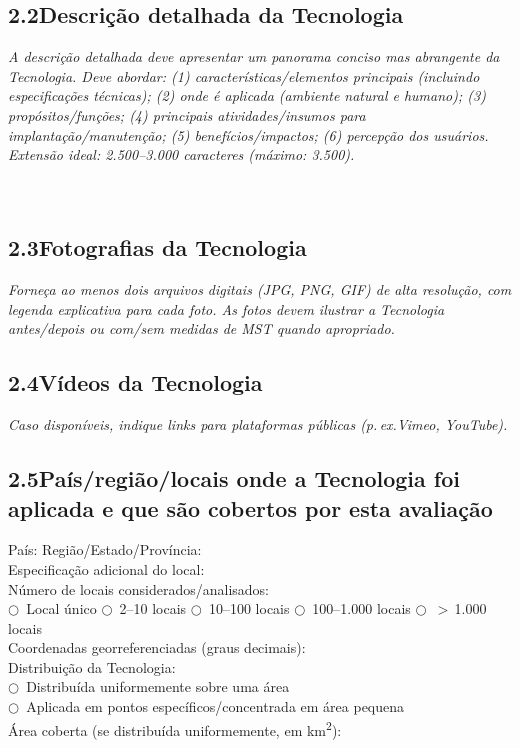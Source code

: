 \subsection{2.2\quad Descrição detalhada da Tecnologia}
\textit{A descrição detalhada deve apresentar um panorama conciso mas abrangente da Tecnologia. Deve abordar: (1) características/elementos principais (incluindo especificações técnicas); (2) onde é aplicada (ambiente natural e humano); (3) propósitos/funções; (4) principais atividades/insumos para implantação/manutenção; (5) benefícios/impactos; (6) percepção dos usuários. Extensão ideal: 2.500--3.000 caracteres (máximo: 3.500).}\\[4pt]
\dotfill\\[2pt]\dotfill\\[2pt]\dotfill

\subsection{2.3\quad Fotografias da Tecnologia}
\textit{Forneça ao menos dois arquivos digitais (JPG, PNG, GIF) de alta resolução, com legenda explicativa para cada foto. As fotos devem ilustrar a Tecnologia antes/depois ou com/sem medidas de MST quando apropriado.}

\subsection{2.4\quad Vídeos da Tecnologia}
\textit{Caso disponíveis, indique links para plataformas públicas (p.\,ex.\@ Vimeo, YouTube).}

\subsection{2.5\quad País/região/locais onde a Tecnologia foi aplicada e que são cobertos por esta avaliação}

País: \dotfill\quad Região/Estado/Província: \dotfill\\
Especificação adicional do local: \dotfill\\[4pt]
Número de locais considerados/analisados:\\
$\bigcirc$~Local único \quad $\bigcirc$~2--10 locais \quad $\bigcirc$~10--100 locais \quad $\bigcirc$~100--1.000 locais \quad $\bigcirc$~$>$\,1.000 locais\\[4pt]
Coordenadas georreferenciadas (graus decimais): \dotfill\\[4pt]
Distribuição da Tecnologia:\\
$\bigcirc$~Distribuída uniformemente sobre uma área\\
$\bigcirc$~Aplicada em pontos específicos/concentrada em área pequena\\
Área coberta (se distribuída uniformemente, em km\textsuperscript{2}): \dotfill

